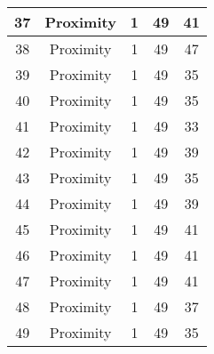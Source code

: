 \documentclass[results.tex]{subfiles}
\begin{document}
\begin{center}
\begin{tabular}{| c || c | c | c | c |}
            \hline
            37                      & Proximity                    & 1                      & 49                      & 41                   \\
            \hline
            38                      & Proximity                    & 1                      & 49                      & 47                   \\
            \hline
            39                      & Proximity                    & 1                      & 49                      & 35                   \\
            \hline
            40                      & Proximity                    & 1                      & 49                      & 35                   \\
            \hline
            41                      & Proximity                    & 1                      & 49                      & 33                   \\
            \hline
            42                      & Proximity                    & 1                      & 49                      & 39                   \\
            \hline
            43                      & Proximity                    & 1                      & 49                      & 35                   \\
            \hline
            44                      & Proximity                    & 1                      & 49                      & 39                   \\
            \hline
            45                      & Proximity                    & 1                      & 49                      & 41                   \\
            \hline
            46                      & Proximity                    & 1                      & 49                      & 41                   \\
            \hline
            47                      & Proximity                    & 1                      & 49                      & 41                   \\
            \hline
            48                      & Proximity                    & 1                      & 49                      & 37                   \\
            \hline
            49                      & Proximity                    & 1                      & 49                      & 35                   \\
            \hline
        \end{tabular}
    \end{center}
\end{document}
